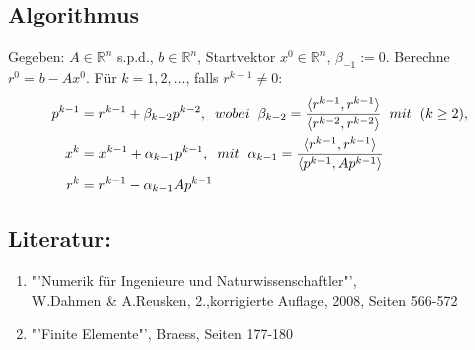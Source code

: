 \documentclass{article}
\begin{document}
\subsection{Algorithmus}
Gegeben: $A \in \mathbb{R}^{n}$ s.p.d., $b \in \mathbb{R}^{n}$, Startvektor $x^{0} \in \mathbb{R}^{n}$, $\beta_{-1} := 0$. Berechne $r^{0} = b - Ax^{0}$. Für $k = 1,2,...$, falls $r^{k-1} \ne 0$:
\begin{subequations}
\begin{align}
	p^{k-1} &= r^{k-1} + \beta_{k-2}p^{k-2}, \hspace{2mm} wobei \hspace{2mm} \beta_{k-2} = \frac {\langle r^{k-1}, r^{k-1} \rangle} {\langle r^{k-2}, r^{k-2} \rangle} \hspace{2mm} mit \hspace{2mm} (k \ge 2),\\
	x^{k} &= x^{k-1} + \alpha_{k-1}p^{k-1}, \hspace{2mm} mit \hspace{2mm} \alpha_{k-1} = \frac {\langle r^{k-1}, r^{k-1} \rangle} {\langle p^{k-1}, Ap^{k-1} \rangle}\\
	r^{k} &= r^{k-1} - \alpha_{k-1}Ap^{k-1}
\end{align}
\end{subequations}

\subsection{Literatur:}
\begin{enumerate}
\item "'Numerik für Ingenieure und Naturwissenschaftler"', \\W.Dahmen \& A.Reusken, 2.,korrigierte Auflage, 2008, Seiten 566-572
\item "'Finite Elemente"', Braess, Seiten 177-180
\end{enumerate}
\end{document}

